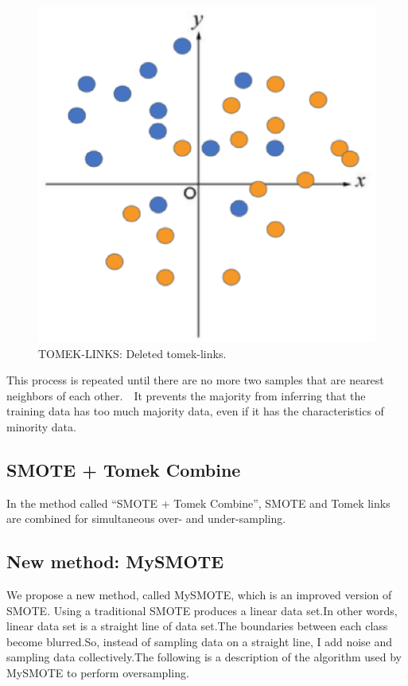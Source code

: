 \begin{center}
    \begin{figure}[ht]
        \caption{TOMEK-LINKS: Deleted tomek-links.}
        \label{tab:team-rating-features}
        \begin{center}
            \includegraphics[scale=0.6]{image/tomek3.eps}
        \end{center}
    \end{figure}
\end{center}

This process is repeated until there are no more two samples that are nearest neighbors of each other.　It prevents the majority from inferring that the training data has too much majority data, even if it has the characteristics of minority data.　
\clearpage

\subsection{SMOTE + Tomek Combine}
In the method called ``SMOTE + Tomek Combine'', SMOTE and Tomek links are combined for simultaneous over- and under-sampling.


\subsection{New method: MySMOTE}
We propose a new method, called MySMOTE, which is an improved version of SMOTE. 
Using a traditional SMOTE produces a linear data set.In other words, linear data set is a straight line of data set.The boundaries between each class become blurred.So, instead of sampling data on a straight line, I add noise and sampling data collectively.The following is a description of the algorithm used by MySMOTE to perform oversampling.


